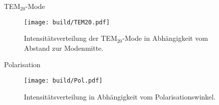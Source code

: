 TEM$_{20}$-Mode

\begin{figure}[H]
  \centering
  \texttt{[image: build/TEM20.pdf]}
  \caption {Intensitätsverteilung der TEM$_{20}$-Mode in Abhängigkeit vom Abstand zur Modenmitte.}
  \label{fig:TEM20}
\end{figure}


Polarisation

\begin{figure}[H]
  \centering
  \texttt{[image: build/Pol.pdf]}
  \caption {Intensitätsverteilung in Abhängigkeit vom Polarisationswinkel.}
  \label{fig:Pol}
\end{figure}